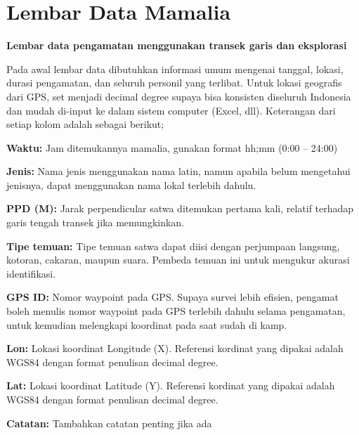 \documentclass[
]{book}
\begin{document}
\hypertarget{lembar-data-mamalia}{%
\section*{Lembar Data Mamalia}\label{lembar-data-mamalia}}

\textbf{Lembar data pengamatan menggunakan transek garis dan eksplorasi}

Pada awal lembar data dibutuhkan informasi umum mengenai tanggal, lokasi, durasi pengamatan, dan seluruh personil yang terlibat. Untuk lokasi geografis dari GPS, set menjadi decimal degree supaya bisa konsisten diseluruh Indonesia dan mudah di-input ke dalam sistem computer (Excel, dll). Keterangan dari setiap kolom adalah sebagai berikut;

\textbf{Waktu:} Jam ditemukannya mamalia, gunakan format hh;mm (0:00 -- 24:00)

\textbf{Jenis:} Nama jenis menggunakan nama latin, namun apabila belum mengetahui jenisnya, dapat menggunakan nama lokal terlebih dahulu.

\textbf{PPD (M):} Jarak perpendicular satwa ditemukan pertama kali, relatif terhadap garis tengah transek jika memungkinkan.

\textbf{Tipe temuan:} Tipe temuan satwa dapat diisi dengan perjumpaan langsung, kotoran, cakaran, maupun suara. Pembeda temuan ini untuk mengukur akurasi identifikasi.

\textbf{GPS ID:} Nomor waypoint pada GPS. Supaya survei lebih efisien, pengamat boleh menulis nomor waypoint pada GPS terlebih dahulu selama pengamatan, untuk kemudian melengkapi koordinat pada saat sudah di kamp.

\textbf{Lon:} Lokasi koordinat Longitude (X). Referensi kordinat yang dipakai adalah WGS84 dengan format penulisan decimal degree.

\textbf{Lat:} Lokasi koordinat Latitude (Y). Referensi kordinat yang dipakai adalah WGS84 dengan format penulisan decimal degree.

\textbf{Catatan:} Tambahkan catatan penting jika ada
\end{document}
